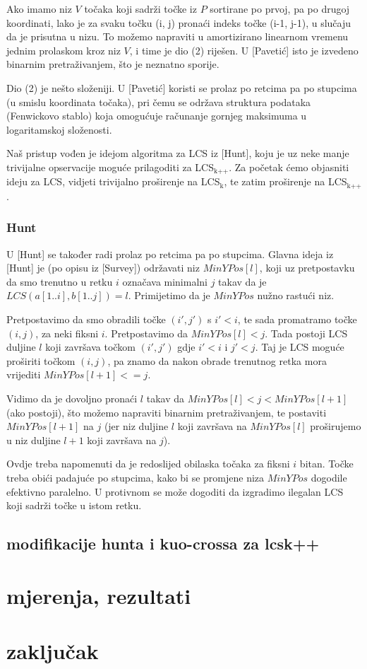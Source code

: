 \documentclass[11pt]{article}
\begin{document}
Ako imamo niz $V$ točaka koji sadrži točke iz $P$ sortirane po prvoj,
pa po drugoj koordinati, lako je za svaku točku (i, j) pronaći indeks
točke (i-1, j-1), u slučaju da je prisutna u nizu. To možemo napraviti
u amortizirano linearnom vremenu jednim prolaskom kroz niz $V$, i time
je dio (2) riješen. U [Pavetić] isto je izvedeno binarnim pretraživanjem,
što je neznatno sporije.

Dio (2) je nešto složeniji. U [Pavetić] koristi se prolaz po retcima
pa po stupcima (u smislu koordinata točaka), pri čemu se održava
struktura podataka (Fenwickovo stablo) koja omogućuje računanje gornjeg
maksimuma u logaritamskoj složenosti. 

Naš pristup vođen je idejom algoritma za LCS iz [Hunt], koju je uz neke
manje trivijalne opservacije moguće prilagoditi za LCS$_{\text{k++}}$. Za početak
ćemo objasniti ideju za LCS, vidjeti trivijalno proširenje na LCS$_{\text{k}}$, te
zatim proširenje na LCS$_{\text{k++}}$.

\subsubsection{Hunt}
\label{sec-2-2-1}
U [Hunt] se također radi prolaz po retcima pa po stupcima.  Glavna
ideja iz [Hunt] je (po opisu iz [Survey]) održavati niz
$MinYPos[l]$, koji uz pretpostavku da smo trenutno u retku $i$
označava minimalni $j$ takav da je $LCS(a[1..i], b[1..j]) =
    l$. Primijetimo da je $MinYPos$ nužno rastući niz.

Pretpostavimo da smo obradili točke $(i', j')$ s $i' < i$, te sada
promatramo točke $(i, j)$, za neki fiksni $i$. Pretpostavimo da
$MinYPos[l] < j$.  Tada postoji LCS duljine $l$ koji završava točkom
$(i', j')$ gdje $i' < i$ i $j' < j$. Taj je LCS moguće proširiti točkom
$(i, j)$, pa znamo da nakon obrade trenutnog retka mora vrijediti
$MinYPos[l+1] <= j$.  

Vidimo da je dovoljno pronaći $l$ takav da $MinYPos[l] < j <
    MinYPos[l+1]$ (ako postoji), što možemo napraviti binarnim
pretraživanjem, te postaviti $MinYPos[l+1]$ na $j$ (jer niz duljine
$l$ koji završava na $MinYPos[l]$ proširujemo u niz duljine $l+1$
koji završava na $j$).

Ovdje treba napomenuti da je redoslijed obilaska točaka za fiksni $i$
bitan. Točke treba obići padajuće po stupcima, kako bi se promjene
niza $MinYPos$ dogodile efektivno paralelno. U protivnom se može
dogoditi da izgradimo ilegalan LCS koji sadrži točke u istom
retku.












\subsection{modifikacije hunta i kuo-crossa za lcsk++}
\label{sec-2-3}

\section{mjerenja, rezultati}
\label{sec-3}

\section{zaključak}
\label{sec-4}
\end{document}

